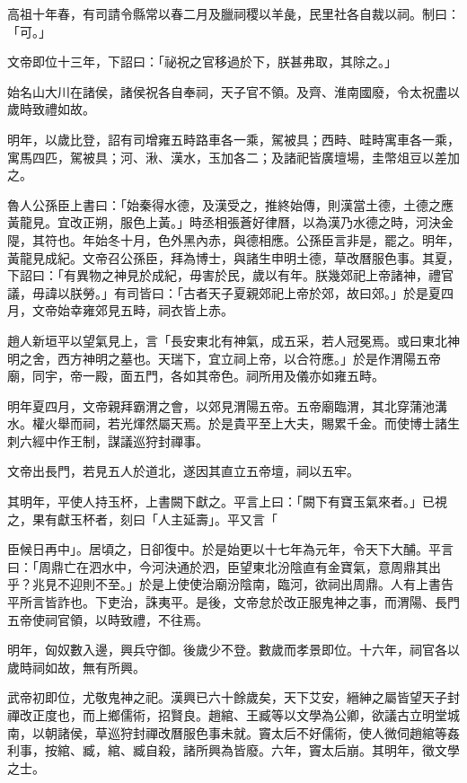 \begin{pinyinscope}
高祖十年春，有司請令縣常以春二月及臘祠稷以羊彘，民里社各自裁以祠。制曰：「可。」

文帝即位十三年，下詔曰：「祕祝之官移過於下，朕甚弗取，其除之。」

始名山大川在諸侯，諸侯祝各自奉祠，天子官不領。及齊、淮南國廢，令太祝盡以歲時致禮如故。

明年，以歲比登，詔有司增雍五畤路車各一乘，駕被具；西畤、畦畤寓車各一乘，寓馬四匹，駕被具；河、湫、漢水，玉加各二；及諸祀皆廣壇場，圭幣俎豆以差加之。

魯人公孫臣上書曰：「始秦得水德，及漢受之，推終始傳，則漢當土德，土德之應黃龍見。宜改正朔，服色上黃。」時丞相張蒼好律曆，以為漢乃水德之時，河決金隄，其符也。年始冬十月，色外黑內赤，與德相應。公孫臣言非是，罷之。明年，黃龍見成紀。文帝召公孫臣，拜為博士，與諸生申明土德，草改曆服色事。其夏，下詔曰：「有異物之神見於成紀，毋害於民，歲以有年。朕幾郊祀上帝諸神，禮官議，毋諱以朕勞。」有司皆曰：「古者天子夏親郊祀上帝於郊，故曰郊。」於是夏四月，文帝始幸雍郊見五畤，祠衣皆上赤。

趙人新垣平以望氣見上，言「長安東北有神氣，成五采，若人冠冕焉。或曰東北神明之舍，西方神明之墓也。天瑞下，宜立祠上帝，以合符應。」於是作渭陽五帝廟，同宇，帝一殿，面五門，各如其帝色。祠所用及儀亦如雍五畤。

明年夏四月，文帝親拜霸渭之會，以郊見渭陽五帝。五帝廟臨渭，其北穿蒲池溝水。權火舉而祠，若光煇然屬天焉。於是貴平至上大夫，賜累千金。而使博士諸生刺六經中作王制，謀議巡狩封禪事。

文帝出長門，若見五人於道北，遂因其直立五帝壇，祠以五牢。

其明年，平使人持玉杯，上書闕下獻之。平言上曰：「闕下有寶玉氣來者。」已視之，果有獻玉杯者，刻曰「人主延壽」。平又言「

臣候日再中」。居頃之，日卻復中。於是始更以十七年為元年，令天下大酺。平言曰：「周鼎亡在泗水中，今河決通於泗，臣望東北汾陰直有金寶氣，意周鼎其出乎？兆見不迎則不至。」於是上使使治廟汾陰南，臨河，欲祠出周鼎。人有上書告平所言皆詐也。下吏治，誅夷平。是後，文帝怠於改正服鬼神之事，而渭陽、長門五帝使祠官領，以時致禮，不往焉。

明年，匈奴數入邊，興兵守御。後歲少不登。數歲而孝景即位。十六年，祠官各以歲時祠如故，無有所興。

武帝初即位，尤敬鬼神之祀。漢興已六十餘歲矣，天下艾安，縉紳之屬皆望天子封禪改正度也，而上鄉儒術，招賢良。趙綰、王臧等以文學為公卿，欲議古立明堂城南，以朝諸侯，草巡狩封禪改曆服色事未就。竇太后不好儒術，使人微伺趙綰等姦利事，按綰、臧，綰、臧自殺，諸所興為皆廢。六年，竇太后崩。其明年，徵文學之士。


\end{pinyinscope}
